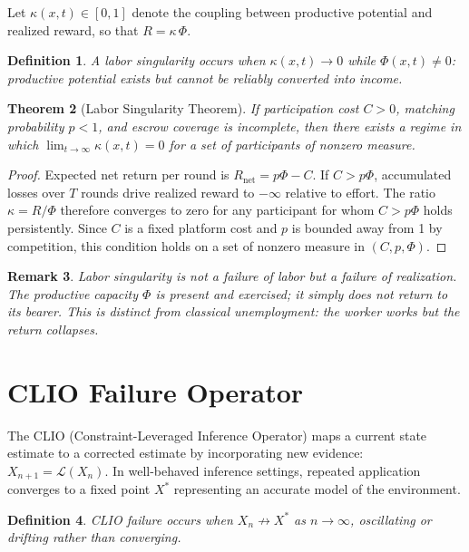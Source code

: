 \documentclass[11pt]{article}
\newtheorem{theorem}{Theorem}
\newtheorem{definition}[theorem]{Definition}
\newtheorem{remark}[theorem]{Remark}
\begin{document}
Let $\kappa(x,t) \in [0,1]$ denote the coupling between productive potential
and realized reward, so that $R = \kappa\,\Phi$.

\begin{definition}
A \emph{labor singularity} occurs when $\kappa(x,t) \to 0$ while
$\Phi(x,t) \neq 0$: productive potential exists but cannot be reliably
converted into income.
\end{definition}

\begin{theorem}[Labor Singularity Theorem]
If participation cost $C > 0$, matching probability $p < 1$, and escrow
coverage is incomplete, then there exists a regime in which
$\lim_{t \to \infty} \kappa(x,t) = 0$ for a set of participants of
nonzero measure.
\end{theorem}

\begin{proof}
Expected net return per round is $R_{\text{net}} = p\Phi - C$. If
$C > p\Phi$, accumulated losses over $T$ rounds drive realized reward to
$-\infty$ relative to effort. The ratio $\kappa = R/\Phi$ therefore converges
to zero for any participant for whom $C > p\Phi$ holds persistently. Since
$C$ is a fixed platform cost and $p$ is bounded away from 1 by competition,
this condition holds on a set of nonzero measure in $(C, p, \Phi)$.
\end{proof}

\begin{remark}
Labor singularity is not a failure of labor but a failure of realization. The
productive capacity $\Phi$ is present and exercised; it simply does not return
to its bearer. This is distinct from classical unemployment: the worker works
but the return collapses.
\end{remark}

\section{CLIO Failure Operator}
\label{sec:clio}

The CLIO (Constraint-Leveraged Inference Operator) maps a current state
estimate to a corrected estimate by incorporating new evidence:
$X_{n+1} = \mathcal{L}(X_n)$.
In well-behaved inference settings, repeated application converges to a fixed
point $X^*$ representing an accurate model of the environment.

\begin{definition}
\emph{CLIO failure} occurs when $X_n \not\to X^*$ as $n \to \infty$,
oscillating or drifting rather than converging.
\end{definition}
\end{document}
